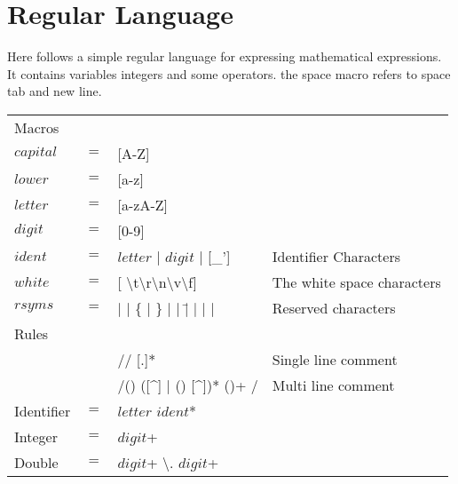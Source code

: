 \chapter{Regular Language}\label{reglang}
Here follows a simple regular language for expressing mathematical expressions.
It contains variables integers and some operators. the space macro refers to
space tab and new line.\\
\begin{tabular}{l c l l}
Macros\\
$capital$ & $=$ & [A-Z]\\
$lower$   & $=$ & [a-z]\\
$letter$  & $=$ & [a-zA-Z]\\
$digit$   & $=$ & [0-9]\\
$ident$   & $=$ & $letter$ | $digit$ | [_'] & Identifier Characters\\
$white$   & $=$ & [ \textbackslash{t}\textbackslash{r}\textbackslash{n}\textbackslash{v}\textbackslash{f}] & The white space characters\\
$rsyms$   & $=$ & \( | \) | \{ | \} | \; | \= | \+ \+ | \< | \+ | \* & Reserved characters\\
Rules\\
& & // [.]* & Single line comment\\
& & /(\*) ([\^\*] | (\*) [\^\/])* (\*)+ / & Multi line comment\\
Identifier & $=$ & $letter$ $ident$*\\
Integer    & $=$ & $digit$+\\
Double     & $=$ & $digit$+ \textbackslash. $digit$+\\
\end{tabular}
